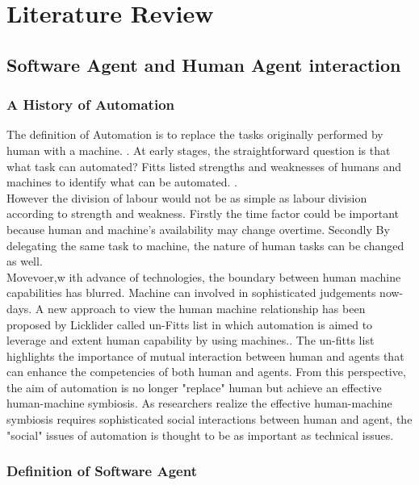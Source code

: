 \chapter{Literature Review}\label{ch:examples}
\section{Software Agent and Human Agent interaction}



\subsection{ A History of Automation }
The definition of Automation is to replace the tasks originally performed by human with a machine. \cite{Bradshaw2011} . At early stages, the straightforward question is that what task can automated?  Fitts listed strengths and weaknesses of humans and machines to identify what can be automated. \cite{Fitts} . \\

However the division of labour would not be as simple as labour division according to strength and weakness. Firstly the time factor could be important because human and machine's availability may change overtime. Secondly By delegating the same task to machine, the nature of human tasks can be changed as well. \cite{Bradshaw2011} \\

Movevoer,w ith advance of technologies, the boundary between human machine capabilities has blurred. Machine can involved in sophisticated judgements now-days. A new approach to view the human machine relationship has been proposed by Licklider called un-Fitts list \cite{Hoffman2002} in which automation is aimed to leverage and extent human capability by using machines.\cite{Bradshaw2011}. The un-fitts list highlights the importance of mutual interaction between human and agents that can enhance the competencies of both human and agents. From this perspective, the aim of automation is no longer "replace" human but achieve an effective human-machine symbiosis. As researchers realize the effective human-machine symbiosis requires sophisticated social interactions between human and agent, the "social" issues of automation is thought to be as important as technical issues. \cite{Bradshaw2011} \\


\subsection{ Definition of Software Agent }

